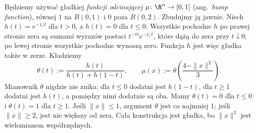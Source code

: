 Będziemy używać gładkiej \emph{funkcji odcinającej}
$\mu\colon\R^n\to[0,1]$ (ang.\ \emph{bump function}),
równej $1$ na $\overline{B(0,1)}$ i $0$ poza $B(0,2)$.
Zbudujmy ją jawnie. Niech $h(t)=e^{-1/t}$ dla $t>0$,
a $h(t)=0$ dla $t\leq0$. Wszystkie pochodne $h$ po
prawej stronie zera są sumami wyrazów postaci
$t^{-m}e^{-1/t}$, które dążą do zera przy $t\downarrow0$;
po lewej stronie wszystkie pochodne wynoszą zero.
Funkcja $h$ jest więc gładka także w zerze. Kładziemy
\[
 \theta(t):=\frac{h(t)}{h(t)+h(1-t)},\qquad
 \mu(x):=\theta\!\left(\frac{4-\|x\|^2}{3}\right).
\]
Mianownik $\theta$ nigdzie nie znika: dla $t\leq0$
dodatni jest $h(1-t)$, dla $t\geq1$ dodatni jest $h(t)$,
a pomiędzy nimi dodatnie są oba. Mamy $\theta(t)=0$
dla $t\leq0$ i $\theta(t)=1$ dla $t\geq1$.
Jeśli $\|x\|\leq1$, argument $\theta$ jest co najmniej $1$;
jeśli $\|x\|\geq2$, jest nie większy od zera.
Cała konstrukcja jest gładka, bo $\|x\|^2$ jest
wielomianem współrzędnych.



